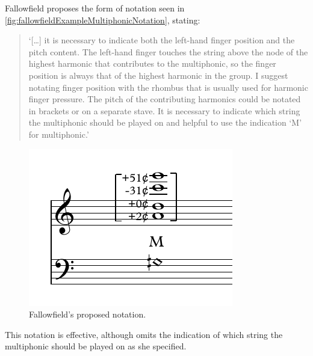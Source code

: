 Fallowfield proposes the form of notation seen in \autoref{fig:fallowfieldExampleMultiphonicNotation}, stating:
\begin{quotation}
  `[\ldots] it is necessary to indicate both the left-hand finger position and the pitch content. 
  The left-hand finger touches the string above the node of the highest harmonic that contributes to the multiphonic, so the finger position is always that of the highest harmonic in the group. 
  I suggest notating finger position with the rhombus that is usually used for harmonic finger pressure. 
  The pitch of the contributing harmonics could be notated in brackets or on a separate stave. 
  It is necessary to indicate which string the multiphonic should be played on and helpful to use the indication ‘M’ for multiphonic.'\autocite[http://www.cellomap.com/index/the-string/multiphonics-and-other-multiple-sounds.html]{fallowfieldCelloMap}
\end{quotation}

\begin{figure}
  \centering
      \includegraphics{./resources/fallowfieldExampleMultiphonicNotation.pdf}
      \caption{Fallowfield's proposed notation.}
  \label{fig:fallowfieldExampleMultiphonicNotation}
\end{figure}

This notation is effective, although omits the indication of which string the multiphonic should be played on as she specified.


